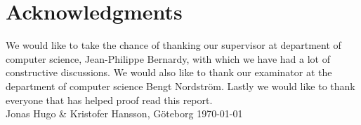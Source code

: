 \newpage
\thispagestyle{empty}
\clearpage
\mbox{}
\newpage
\clearpage
\thispagestyle{empty}
\section*{Acknowledgments}
We would like to take the chance of thanking our supervisor at department of
computer science, Jean-Philippe Bernardy, with which we have had a lot of
constructive discussions. We would also like to thank our examinator at the
department of computer science Bengt Nordström. Lastly we would like to thank
everyone that has helped proof read this report.\\[1cm]

\hfill Jonas Hugo \& Kristofer Hansson, Göteborg \mydate\today
